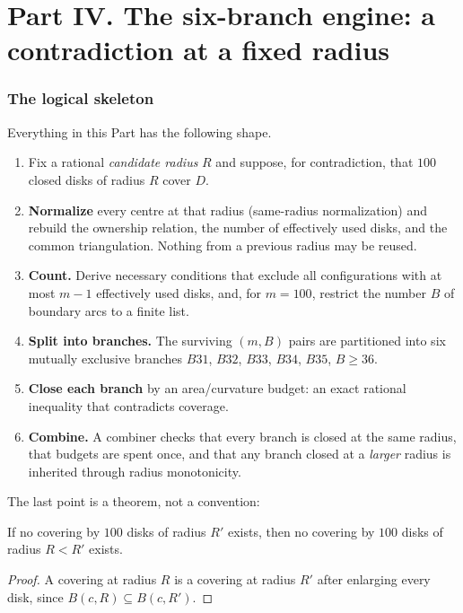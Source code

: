 \part*{Part IV. The six-branch engine: a contradiction at a fixed radius}
\setcounter{section}{0}

\section{The logical skeleton}

Everything in this Part has the following shape.

\begin{enumerate}[leftmargin=1.6em,itemsep=3pt]
\item Fix a rational \emph{candidate radius} $R$ and suppose, for contradiction, that $100$ closed
disks of radius $R$ cover $D$.
\item \textbf{Normalize} every centre at that radius (same-radius normalization) and rebuild the
ownership relation, the number of effectively used disks, and the common triangulation. Nothing from
a previous radius may be reused.
\item \textbf{Count.} Derive necessary conditions that exclude all configurations with at most
$m-1$ effectively used disks, and, for $m=100$, restrict the number $B$ of boundary arcs to a finite
list.
\item \textbf{Split into branches.} The surviving $(m,B)$ pairs are partitioned into six mutually
exclusive branches $B31$, $B32$, $B33$, $B34$, $B35$, $B{\ge}36$.
\item \textbf{Close each branch} by an area/curvature budget: an exact rational inequality that
contradicts coverage.
\item \textbf{Combine.} A combiner checks that every branch is closed at the same radius, that
budgets are spent once, and that any branch closed at a \emph{larger} radius is inherited through
radius monotonicity.
\end{enumerate}

The last point is a theorem, not a convention:

\begin{lemma}\label{lem:monotone}
If no covering by $100$ disks of radius $R'$ exists, then no covering by $100$ disks of radius $R<R'$
exists.
\end{lemma}
\begin{proof}
A covering at radius $R$ is a covering at radius $R'$ after enlarging every disk, since
$B(c,R)\subseteq B(c,R')$.
\end{proof}

